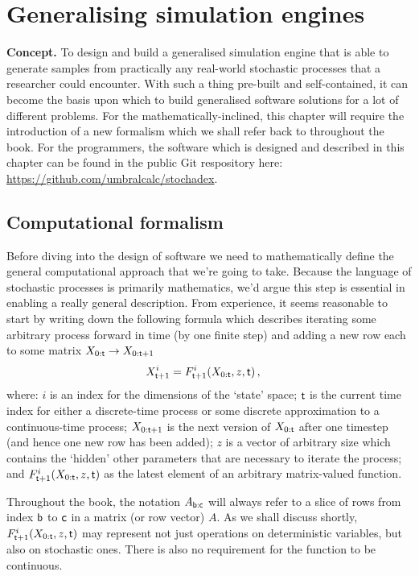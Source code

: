 \chapter{\sffamily Generalising simulation engines}

{\bfseries\sffamily Concept.} To design and build a generalised simulation engine that is able to generate samples from practically any real-world stochastic processes that a researcher could encounter. With such a thing pre-built and self-contained, it can become the basis upon which to build generalised software solutions for a lot of different problems. For the mathematically-inclined, this chapter will require the introduction of a new formalism which we shall refer back to throughout the book. For the programmers, the software which is designed and described in this chapter can be found in the public Git respository here: \href{https://github.com/umbralcalc/stochadex}{https://github.com/umbralcalc/stochadex}.

\section{\sffamily Computational formalism}

Before diving into the design of software we need to mathematically define the general computational approach that we're going to take. Because the language of stochastic processes is primarily mathematics, we'd argue this step is essential in enabling a really general description. From experience, it seems reasonable to start by writing down the following formula which describes iterating some arbitrary process forward in time (by one finite step) and adding a new row each to some matrix $X_{0:{\sf t}} \rightarrow X_{0:{\sf t}+1}$
\begin{align}
X^{i}_{{\sf t}+1} &= F^{i}_{{\sf t}+1}(X_{0:{\sf t}},z,{\sf t}) \,, \label{eq:x-step-def}
\end{align}
where: $i$ is an index for the dimensions of the `state' space; ${\sf t}$ is the current time index for either a discrete-time process or some discrete approximation to a continuous-time process; $X_{0:{\sf t}+1}$ is the next version of $X_{0:{\sf t}}$ after one timestep (and hence one new row has been added); $z$ is a vector of arbitrary size which contains the `hidden' other parameters that are necessary to iterate the process; and $F^i_{{\sf t}+1}(X_{0:{\sf t}},z,{\sf t})$ as the latest element of an arbitrary matrix-valued function. 

Throughout the book, the notation $A_{{{\sf b}:{\sf c}}}$ will always refer to a slice of rows from index ${\sf b}$ to ${\sf c}$ in a matrix (or row vector) $A$. As we shall discuss shortly, $F^i_{{\sf t}+1}(X_{0:{\sf t}},z,{\sf t})$ may represent not just operations on deterministic variables, but also on stochastic ones. There is also no requirement for the function to be continuous.

